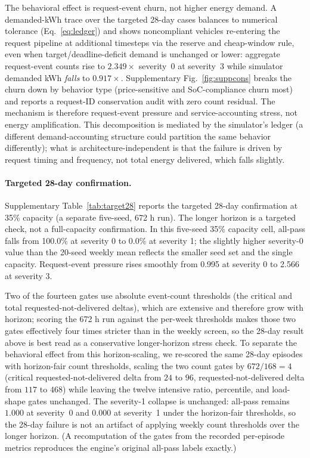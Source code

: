 \documentclass[12pt]{article}
\begin{document}
The behavioral effect is request-event churn, not higher energy demand. A demanded-kWh trace over the targeted 28-day cases balances to numerical tolerance (Eq.~\eqref{eq:ledger}) and shows noncompliant vehicles re-entering the request pipeline at additional timesteps via the reserve and cheap-window rule, even when target/deadline-deficit demand is unchanged or lower: aggregate request-event counts rise to $2.349\times$ severity~0 at severity~3 while simulator demanded kWh \emph{falls} to $0.917\times$. Supplementary Fig.~\ref{fig:suppcons} breaks the churn down by behavior type (price-sensitive and SoC-compliance churn most) and reports a request-ID conservation audit with zero count residual. The mechanism is therefore request-event pressure and service-accounting stress, not energy amplification. This decomposition is mediated by the simulator's ledger (a different demand-accounting structure could partition the same behavior differently); what is architecture-independent is that the failure is driven by request timing and frequency, not total energy delivered, which falls slightly.

\paragraph{Targeted 28-day confirmation.} Supplementary Table~\ref{tab:target28} reports the targeted 28-day confirmation at 35\% capacity (a separate five-seed, 672 h run). The longer horizon is a targeted check, not a full-capacity confirmation. In this five-seed 35\% capacity cell, all-pass falls from 100.0\% at severity 0 to 0.0\% at severity 1; the slightly higher severity-0 value than the 20-seed weekly mean reflects the smaller seed set and the single capacity. Request-event pressure rises smoothly from 0.995 at severity 0 to 2.566 at severity 3.

Two of the fourteen gates use absolute event-count thresholds (the critical and total requested-not-delivered deltas), which are extensive and therefore grow with horizon; scoring the 672 h run against the per-week thresholds makes those two gates effectively four times stricter than in the weekly screen, so the 28-day result above is best read as a conservative longer-horizon stress check. To separate the behavioral effect from this horizon-scaling, we re-scored the same 28-day episodes with horizon-fair count thresholds, scaling the two count gates by $672/168=4$ (critical requested-not-delivered delta from $24$ to $96$, requested-not-delivered delta from $117$ to $468$) while leaving the twelve intensive ratio, percentile, and load-shape gates unchanged. The severity-1 collapse is unchanged: all-pass remains $1.000$ at severity~0 and $0.000$ at severity~1 under the horizon-fair thresholds, so the 28-day failure is not an artifact of applying weekly count thresholds over the longer horizon. (A recomputation of the gates from the recorded per-episode metrics reproduces the engine's original all-pass labels exactly.)
\end{document}
